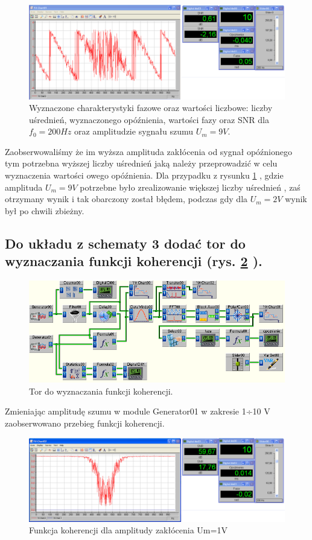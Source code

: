 \documentclass{classrep}
\begin{document}
\begin{figure}[H]
	\centering
	\includegraphics[width=0.8\linewidth]{wyk9}
	\caption{Wyznaczone charakterystyki fazowe oraz wartości liczbowe: liczby uśrednień, wyznaczonego opóźnienia, wartości fazy oraz SNR dla $f_0 =200 Hz$ oraz amplitudzie sygnału szumu $U_m= 9V$.}
	\label{fig:wyk9}
\end{figure}
Zaobserwowaliśmy że im wyższa amplituda zakłócenia od sygnał opóźnionego tym potrzebna wyższej liczby uśrednień jaką należy przeprowadzić w celu wyznaczenia wartości owego opóźnienia. Dla przypadku z rysunku \ref{fig:wyk9} , gdzie amplituda $U_m=9V$ potrzebne było zrealizowanie większej liczby uśrednień , zaś otrzymany wynik i tak obarczony został błędem, podczas gdy dla $U_m =2V$ wynik był po chwili zbieżny.
\subsection{Do układu z schematy 3 dodać tor do wyznaczania funkcji koherencji (rys. \ref{fig:sch4} ).}

\begin{figure}[H]
\centering
\includegraphics[width=0.7\linewidth]{sch4}
\caption{Tor do wyznaczania funkcji koherencji.}
\label{fig:sch4}
\end{figure}

Zmieniając amplitudę szumu w module Generator01 w zakresie 1÷10 V zaobserwowano przebieg funkcji koherencji.

\begin{figure}[H]
	\centering
	\includegraphics[width=0.8\linewidth]{wyk12}
	\caption{Funkcja koherencji dla amplitudy zakłócenia Um=1V}
	\label{fig:wyk12}
\end{figure}
\end{document}
